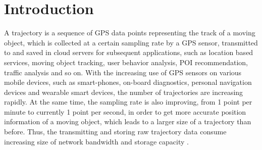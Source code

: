 \section{Introduction}
\label{sec-into}

A trajectory is a sequence of GPS data points representing the track of a moving object, which is collected at a certain sampling rate by a GPS sensor, transmitted to and saved in cloud servers for subsequent applications, such as location based services, moving object tracking, user behavior analysis, POI recommendation, {traffic analysis} and so on. 
%
With the increasing use of GPS sensors on various mobile devices, such as smart-phones, on-board diagnostics, personal navigation devices and wearable smart devices, the number of trajectories are increasing rapidly.
At the same time, the sampling rate is also improving, \eg from 1 point per minute to currently 1 point per second, in order to get more accurate position information of a moving object, which leads to a larger size of a trajectory than before. Thus, the transmitting and storing raw trajectory data consume increasing size of network bandwidth and storage capacity \cite{Chen:Trajectory,  Chen:Fast, Meratnia:Spatiotemporal, Keogh:online, Liu:BQS, Muckell:Compression,Cao:Spatio, Popa:Spatio, Schmid:Semantic,Richter:Semantic,Long:Direction,Nibali:Trajic}.


